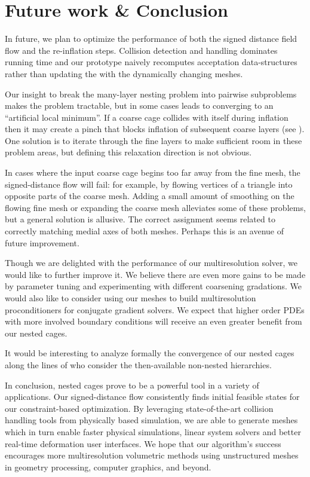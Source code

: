 \section{Future work \& Conclusion}
\label{sec:conclusion}
%
In future, we plan to optimize the performance of both the signed distance
field flow and the re-inflation steps.
%
Collision detection and handling dominates running time and our prototype
naively recomputes acceptation data-structures rather than updating the with
the dynamically changing meshes.

Our insight to break the many-layer nesting problem into pairwise subproblems
makes the problem tractable, but in some cases leads to converging to an
``artificial local minimum''. If a coarse cage collides with itself during
inflation then it may create a pinch that blocks inflation of subsequent coarse
layers (see ).
%
One solution is to iterate through the fine layers to make sufficient room in
these problem areas, but defining this relaxation direction is not obvious.

In cases where the input coarse cage begins too far away from the fine mesh,
the signed-distance flow will fail: for example, by flowing vertices of a
triangle into opposite parts of the coarse mesh. 
%
Adding a small amount of smoothing on the flowing fine mesh or expanding the
coarse mesh alleviates some of these problems, but a general solution is
allusive.
%
The correct assignment seems related to correctly matching medial axes of both
meshes. Perhaps this is an avenue of future improvement.

Though we are delighted with the performance of our multiresolution solver, 
we would like to further improve it. We believe there are even more gains to be
made by parameter tuning and experimenting with different coarsening
gradations. We would also like to consider using our meshes to build
multiresolution proconditioners for conjugate gradient solvers.
%
We expect that higher order PDEs with more involved boundary conditions will
receive an even greater benefit from our nested cages.

It would be interesting to analyze formally the convergence of our nested cages
along the lines of \cite{chan1996convergence} who consider the then-available
non-nested hierarchies.


In conclusion, nested cages prove to be a powerful tool in a variety of
applications. 
%
Our signed-distance flow consistently finds initial feasible states for our
constraint-based optimization.
%
By leveraging state-of-the-art collision handling tools from physically based
simulation, we are able to generate meshes which in turn enable faster physical
simulations, linear system solvers and better real-time deformation user
interfaces.
%
We hope that our algorithm's success encourages more multiresolution volumetric
methods using unstructured meshes in geometry processing, computer graphics,
and beyond.
